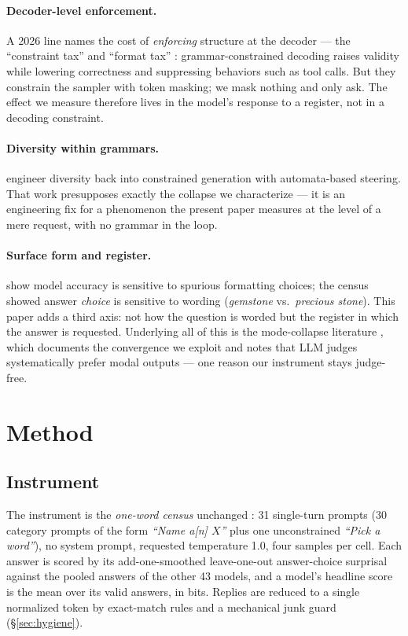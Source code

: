 \documentclass[11pt]{article}
\begin{document}
\paragraph{Decoder-level enforcement.}
A 2026 line names the cost of \emph{enforcing} structure at the decoder --- the ``constraint
tax'' \citep{constrainttax2026validity, constrainttax2026tools} and ``format tax''
\citep{formattax2026}: grammar-constrained decoding raises validity while lowering correctness
and suppressing behaviors such as tool calls. But they constrain the sampler with
token masking; we mask nothing and only ask. The effect we measure therefore lives in the
model's response to a register, not in a decoding constraint.

\paragraph{Diversity within grammars.}
\citet{automata2025diverse} engineer diversity back into constrained generation with
automata-based steering. That work presupposes exactly the collapse we characterize --- it is
an engineering fix for a phenomenon the present paper measures at the level of a mere request,
with no grammar in the loop.

\paragraph{Surface form and register.}
\citet{sclar2024formatspread} show model accuracy is sensitive to spurious formatting choices;
the census showed answer \emph{choice} is sensitive to wording (\emph{gemstone} vs.\
\emph{precious stone}). This paper adds a third axis: not how the question is worded but the
register in which the answer is requested. Underlying all of this is the mode-collapse
literature \citep{jiang2025hivemind, zhang2025noveltybench, kirk2024rlhf}, which documents the
convergence we exploit and notes that LLM judges systematically prefer modal outputs --- one
reason our instrument stays judge-free.

\section{Method}
\label{sec:method}

\subsection{Instrument}
The instrument is the \emph{one-word census} unchanged \citep{parikh2026census}: 31 single-turn prompts (30
category prompts of the form \emph{``Name a[n] $X$''} plus one unconstrained \emph{``Pick a
word''}), no system prompt, requested temperature 1.0, four samples per cell. Each answer is
scored by its add-one-smoothed leave-one-out answer-choice surprisal against the pooled answers
of the other 43 models, and a model's headline score is the mean over its valid answers, in
bits. Replies are reduced to a single normalized token by exact-match rules and a mechanical
junk guard (\S\ref{sec:hygiene}).
\end{document}
